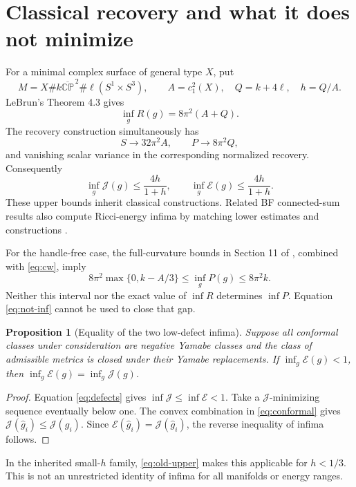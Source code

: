 \documentclass[11pt]{article}
\newtheorem{proposition}{Proposition}[section]
\theoremstyle{remark}
\newcommand{\CP}{\mathbb{CP}}
\newcommand{\E}{\mathcal E}
\newcommand{\J}{\mathcal J}
\begin{document}
\section{Classical recovery and what it does not minimize}

For a minimal complex surface of general type $X$, put
\[
 M=X\#k\overline{\CP}^{\,2}\#\ell(S^1\times S^3),\qquad
 A=c_1^2(X),\quad Q=k+4\ell,\quad h=Q/A.
\]
LeBrun's Theorem 4.3 \cite{LeBrunRicci} gives
\begin{equation}
 \inf_gR(g)=8\pi^2(A+Q).
\end{equation}
The recovery construction simultaneously has
\[
 S\longrightarrow32\pi^2A,\qquad
 P\longrightarrow8\pi^2Q,
\]
and vanishing scalar variance in the corresponding normalized recovery.
Consequently
\begin{equation}\label{eq:old-upper}
 \inf_g\J(g)\le\frac{4h}{1+h},\qquad
 \inf_g\E(g)\le\frac{4h}{1+h}.
\end{equation}
These upper bounds inherit classical constructions. Related BF
connected-sum results also compute Ricci-energy infima by matching
lower estimates and constructions \cite{IshidaLeBrun}.

For the handle-free case, the full-curvature bounds in Section 11 of
\cite{LeBrunOptimal}, combined with \eqref{eq:cw}, imply
\begin{equation}
 8\pi^2\max\{0,k-A/3\}\le\inf_gP(g)\le8\pi^2k.
\end{equation}
Neither this interval nor the exact value of $\inf R$ determines
$\inf P$. Equation \eqref{eq:not-inf} cannot be used to close that gap.

\begin{proposition}[Equality of the two low-defect infima]
Suppose all conformal classes under consideration are negative Yamabe
classes and the class of admissible metrics is closed under their
Yamabe replacements. If $\inf_g\E(g)<1$, then
$\inf_g\E(g)=\inf_g\J(g)$.
\end{proposition}
\begin{proof}
Equation \eqref{eq:defects} gives $\inf\J\le\inf\E<1$.
Take a $\J$-minimizing sequence eventually below one. The convex
combination in \eqref{eq:conformal} gives
$\J(\widehat g_i)\le\J(g_i)$. Since
$\E(\widehat g_i)=\J(\widehat g_i)$, the reverse inequality of
infima follows.
\end{proof}
In the inherited small-$h$ family, \eqref{eq:old-upper} makes this
applicable for $h<1/3$. This is not an unrestricted identity of infima
for all manifolds or energy ranges.
\end{document}
